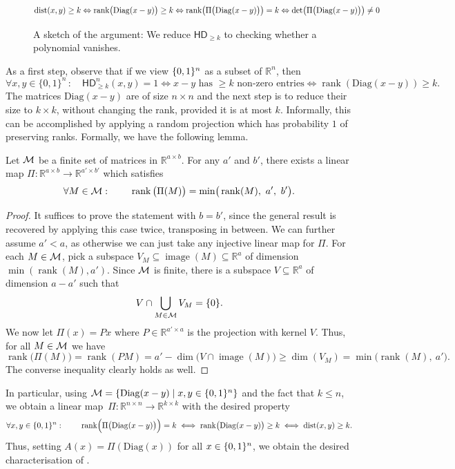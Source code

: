 \documentclass{article}
\DeclareMathOperator{\img}{image}
\newcommand{\Diag}{\mathrm{Diag}}
\DeclareMathOperator{\rank}{rank}
\newcommand{\HD}[1]{\mathsf{HD}_{#1}}
\newcommand{\R}{\mathbb{R}}
\begin{document}
\begin{figure}[H]
	\begin{center}
		
	\end{center}
        {\color{captioncolor}
	\[
	\dist(x,y) \geq k \Leftrightarrow \rank\!\big(\Diag(x-y)\big) \geq k\Leftrightarrow  \rank\!\big(\Pi\big(\Diag(x-y)\big)\big) = k \Leftrightarrow \det\!\big(\Pi\big(\Diag(x-y)\big)\big) \neq 0
	\]\vspace{-5mm}
        }
        \caption{A sketch of the argument: We reduce $\HD{\geq k}$ to checking whether a polynomial vanishes.}
        \label{fig:khd-proof}
\end{figure}

As a first step, observe that if we view $\{0,1\}^n$ as a subset of $\R^n$, then
\begin{equation}\label{eq:first-step}
\forall x,y\in\{0,1\}^n\,\colon\quad \HD{\geq k}^n(x,y) = 1 \iff x-y \text{ has $\geq k$ non-zero entries} \iff \rank(\Diag(x-y)) \geq k.
\end{equation}
The matrices $\Diag(x-y)$ are of size $n \times n$ and the next step is to reduce their size to $k\times k$, without changing the rank, provided it is at most $k$.
Informally, this can be accomplished by applying a random projection which has
probability $1$ of preserving ranks. Formally, we have the following lemma.
\begin{boxlemma}
    \label{lemma:rank-compression}
    Let $\mathcal{M}$ be a finite set of matrices in $\R^{a\times b}$. For any $a'$ and $b'$, there exists a linear map $\Pi\colon \R^{a\times b}\to\R^{a'\times b'}$ which satisfies
    \[
    \forall M\in \cM\,\colon\qquad \rank\big(\Pi(M)\big) = \min\!\big(\rank(M),\ a',\ b'\big).
    \]
\end{boxlemma}
\begin{proof}
It suffices to prove the statement with $b = b'$, since the general result is
recovered by applying this case twice, transposing in between. We can further
assume $a' < a$, as otherwise we can just take any injective linear map for
$\Pi$. For each $M\in\mathcal{M}$, pick a subspace $V_M\subseteq \img(M)\subseteq \R^a$
of dimension $\min(\rank(M), a')$. Since $\mathcal{M}$ is finite, there is a subspace
$V\subseteq\R^a$ of dimension $a-a'$ such that
\[
V\cap \bigcup_{M\in\mathcal{M}} V_M = \{0\}.
\]
We now let $\Pi(x) = Px$ where $P\in\R^{a'\times a}$ is the projection with kernel $V$. Thus, for all $M\in\mathcal{M}$ we have
\[
\rank\big(\Pi(M)\big) = \rank(PM) = a' - \dim\!\big(V \cap \img(M)\big) \geq \dim(V_M) = \min\!\big(\rank(M),\ a'\big).
\]
The converse inequality clearly holds as well.
\end{proof}
In particular, using $\cM = \{\Diag(x-y)\mid x,y\in \zo^n\}$ and the fact that
$k\leq n$, we obtain a linear map~$\Pi\colon\R^{n\times n}\to
\R^{k\times k}$ with the desired property
\begin{equation}\label{eq:khd-rank-problem}
\forall x,y\in \{0,1\}^n\,\colon\qquad \rank\!\Big(\Pi\big(\Diag(x-y)\big)\Big) = k \iff \rank\!\big(\Diag(x-y)\big) \geq k
\iff \dist(x,y) \geq k.
\end{equation}
Thus, setting $A(x) = \Pi(\Diag(x))$ for all $x\in\{0,1\}^n$, we obtain the desired characterisation of .
\end{document}
